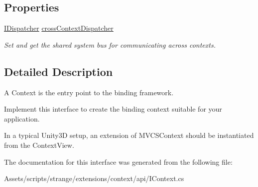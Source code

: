 \subsection*{Properties}
\begin{DoxyCompactItemize}
\item 
\hypertarget{interfacestrange_1_1extensions_1_1context_1_1api_1_1_i_context_ac0e9b15b9639efe7ad58d0b9cfe0445a}{\hyperlink{interfacestrange_1_1extensions_1_1dispatcher_1_1api_1_1_i_dispatcher}{I\-Dispatcher} \hyperlink{interfacestrange_1_1extensions_1_1context_1_1api_1_1_i_context_ac0e9b15b9639efe7ad58d0b9cfe0445a}{cross\-Context\-Dispatcher}}\label{interfacestrange_1_1extensions_1_1context_1_1api_1_1_i_context_ac0e9b15b9639efe7ad58d0b9cfe0445a}

\begin{DoxyCompactList}\small\item\em Set and get the shared system bus for communicating across contexts. \end{DoxyCompactList}\end{DoxyCompactItemize}


\subsection{Detailed Description}
A Context is the entry point to the binding framework. 

Implement this interface to create the binding context suitable for your application.

In a typical Unity3\-D setup, an extension of M\-V\-C\-S\-Context should be instantiated from the Context\-View. 

The documentation for this interface was generated from the following file\-:\begin{DoxyCompactItemize}
\item 
Assets/scripts/strange/extensions/context/api/I\-Context.\-cs\end{DoxyCompactItemize}
